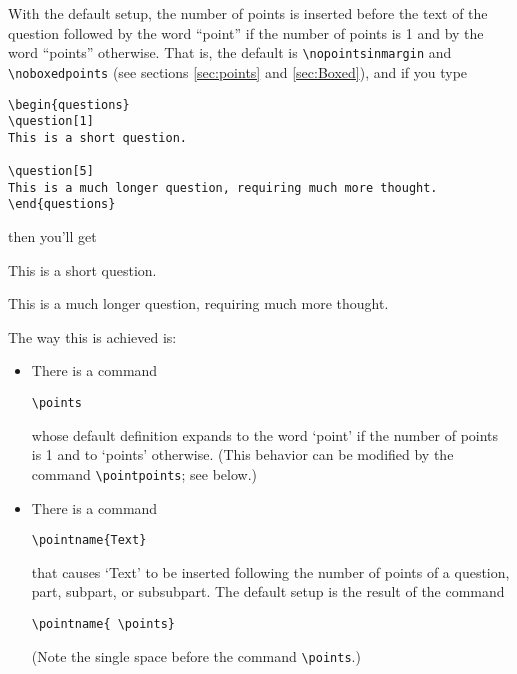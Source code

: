 \documentclass[12pt]{exam}
\begin{document}
With the default setup, the number of points is inserted before the
text of the question followed by the word ``point'' if the number of
points is 1 and by the word ``points'' otherwise.  That is, the
default is \verb"\nopointsinmargin" and \verb"\noboxedpoints" (see
sections \ref{sec:points} and \ref{sec:Boxed}), and if you type
\nopointsinmargin \noboxedpoints
\begin{verbatim}
\begin{questions}
\question[1]
This is a short question.

\question[5]
This is a much longer question, requiring much more thought.
\end{questions}
\end{verbatim}
then you'll get
\begin{questions}
\question[1]
This is a short question.

\question[5]
This is a much longer question, requiring much more thought.
\end{questions}
The way this is achieved is:
\begin{itemize}
\item There is a command 
  \begin{center}
    \verb"\points"
  \end{center}
  whose default definition expands to the word `point' if the number
  of points is 1 and to `points' otherwise.  (This behavior can be
  modified by the command \verb"\pointpoints"; see below.)
\item There is a command 
  \begin{center}
    \verb"\pointname{Text}"
  \end{center}
  that causes `Text' to be inserted following the number of points of
  a question, part, subpart, or subsubpart.  The default setup is the
  result of the command
  \begin{center}
    \verb"\pointname{ \points}"
  \end{center}
  (Note the single space before the command \verb"\points".)
\end{itemize}
\end{document}

